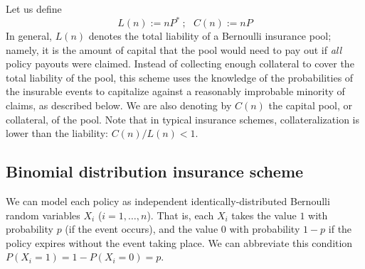 \documentclass[12pt]{article}
\begin{document}
Let us define
$$L(n) := nP^*\ ;\ \ \ C(n) := nP$$
In general, $L(n)$ denotes the total liability of a Bernoulli insurance pool; namely, it is the amount of capital that the pool would need to pay out if \textit{all} policy payouts were claimed. Instead of collecting enough collateral to cover the total liability of the pool, this scheme uses the knowledge of the probabilities of the insurable events to capitalize against a reasonably improbable minority of claims, as described below. We are also denoting by $C(n)$ the capital pool, or collateral, of the pool. Note that in typical insurance schemes, collateralization is lower than the liability: $C(n)/L(n) < 1$.

\subsection{Binomial distribution insurance scheme}

We can model each policy as independent identically-distributed Bernoulli random variables $X_i$ ($i = 1,\ldots, n$). That is, each $X_i$ takes the value $1$ with probability $p$ (if the event occurs), and the value $0$ with probability $1-p$ if the policy expires without the event taking place. We can abbreviate this condition $P(X_i = 1) = 1 - P(X_i = 0) = p$.
\end{document}
